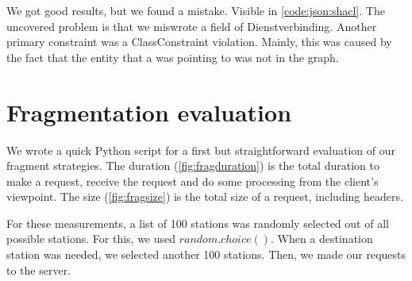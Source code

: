 We got good results, but we found a mistake. Visible in \autoref{code:json:shacl}. The uncovered problem is that we miswrote a field of Dienstverbinding. Another primary constraint was a ClassConstraint violation. Mainly, this was caused by the fact that the entity that a  was pointing to was not in the graph.

\section{Fragmentation evaluation}\label{sec:frag:eval}
We wrote a quick Python script for a first but straightforward evaluation of our fragment strategies. The duration (\autoref{fig:fragduration}) is the total duration to make a request, receive the request and do some processing from the client's viewpoint. The size (\autoref{fig:fragsize}) is the total size of a request, including headers.

For these measurements, a list of 100 stations was randomly selected out of all possible stations. For this, we used $random.choice()$. When a destination station was needed, we selected another 100 stations. Then, we made our requests to the server.

